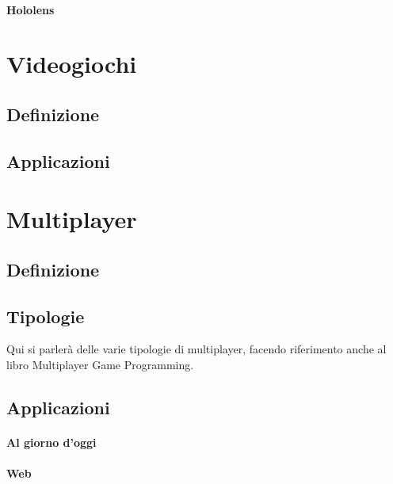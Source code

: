         \paragraph{Hololens}

\section{Videogiochi}\label{sec:Videogiochi}
    \subsection{Definizione}\label{subsec:VideogiochiDef}
    \subsection{Applicazioni}\label{subsec:VideogiochiTipologie}

\section{Multiplayer}\label{sec:Multiplayer}
    \subsection{Definizione}\label{subsec:MultiDef}
    \subsection{Tipologie}\label{subsec:MultiTipologie}
    Qui si parlerà delle varie tipologie di multiplayer, facendo riferimento anche al libro Multiplayer Game Programming.
    \subsection{Applicazioni}\label{subsec:CoopApplicazioni}
        \paragraph{Al giorno d'oggi}\label{par:MultiOggi}
        \paragraph{Web}\label{par:CoopWeb}
